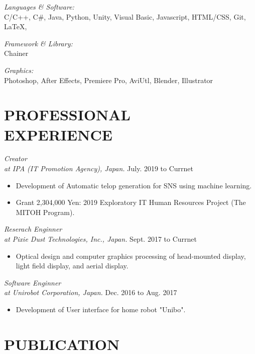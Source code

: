 \documentclass[margin]{res}
\begin{document}
\begin{resume}
{\sl Languages \& Software:}\\
C/C++, C\#, Java, Python, Unity, Visual Basic, Javascript, HTML/CSS,
Git, LaTeX,

{\sl Framework \& Library:}\\
Chainer

{\sl Graphics:}\\
Photoshop, After Effects, Premiere Pro, AviUtl, Blender, Illustrator

\section{PROFESSIONAL \\ EXPERIENCE}

{\sl Creator \\ at IPA (IT Promotion Agency), Japan.} \hfill July. 2019 to Currnet \\

\begin{itemize}
  \item Development of Automatic telop generation for SNS using machine learning.
  \item Grant 2,304,000 Yen: 2019 Exploratory IT Human Resources Project (The MITOH Program).
\end{itemize}

{\sl Reserach Enginner \\ at Pixie Dust Technologies, Inc., Japan.} \hfill Sept. 2017 to Currnet \\

\begin{itemize}  \itemsep -2pt
  \item Optical design and computer graphics processing of head-mounted display, light field display, and aerial display.
\end{itemize}

{\sl Software Enginner \\ at Unirobot Corporation, Japan.} \hfill Dec. 2016 to Aug. 2017 \\

\begin{itemize}  \itemsep -2pt
  \item Development of User interface for home robot "Unibo".
\end{itemize}

\section{PUBLICATION}


\end{resume}
\end{document}
